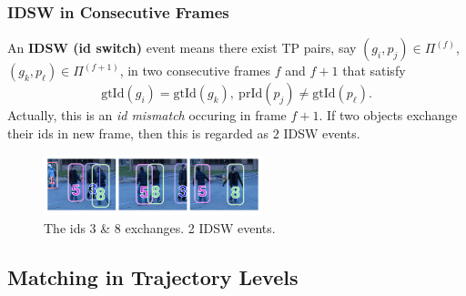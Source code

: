 \documentclass[slidetop, mathserif]{beamer}
\begin{document}
\begin{frame}
	\frametitle{IDSW in Consecutive Frames}
	
	An {\bf IDSW (id switch)} event means there exist TP pairs, say $(g_i, p_j)\in\Pi^{(f)}$,
	$(g_k, p_\ell)\in\Pi^{(f+1)}$, in two consecutive frames
	$f$ and $f+1$ that satisfy
	\[
		\text{gtId}(g_i) = \text{gtId}(g_k),\ 
		\text{prId}(p_j) \neq \text{gtId}(p_\ell).
	\]
	Actually, this is an \emph{id mismatch} occuring in frame $f+1$.
	If two objects exchange their ids in new frame, then this is regarded as $2$
	IDSW events.
	\begin{figure}
		\includegraphics[width=180pt]{pics/fig3.png}
		\caption{The ids 3 \& 8 exchanges. 2 IDSW events.}
	\end{figure}
	    
\end{frame}

\subsection{Matching in Trajectory Levels}
\end{document}

